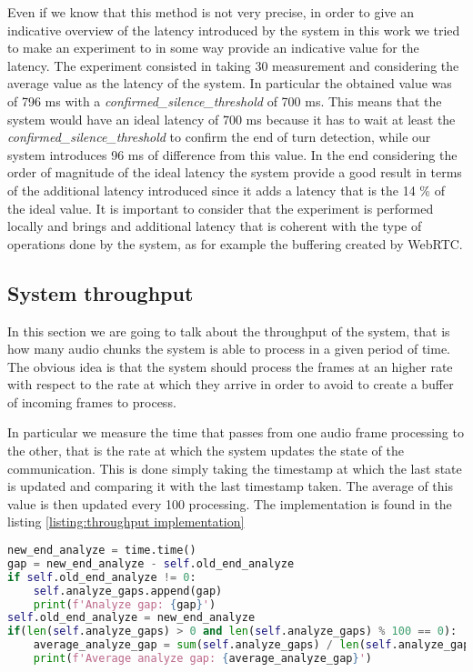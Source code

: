 \documentclass[../main.tex]{subfiles}
\begin{document}
Even if we know that this method is not very precise, in order to give an indicative overview of the latency introduced by the system in this work we tried to make an experiment to in some way provide an indicative value for the latency. The experiment consisted in taking 30 measurement and considering the average value as the latency of the system. In particular the obtained value was of 796 ms with a \textit{confirmed\_silence\_threshold} of 700 ms. This means that the system would have an ideal latency of 700 ms because it has to wait at least the \textit{confirmed\_silence\_threshold} to confirm the end of turn detection, while our system introduces 96 ms of difference from this value. In the end considering the order of magnitude of the ideal latency the system provide a good result in terms of the additional latency introduced since it adds a latency that is the 14 \% of the ideal value. It is important to consider that the experiment is performed locally and brings and additional latency that is coherent with the type of operations done by the system, as for example the buffering created by WebRTC. 

\subsection{System throughput}

In this section we are going to talk about the throughput of the system, that is how many audio chunks the system is able to process in a given period of time. The obvious idea is that the system should process the frames at an higher rate with respect to the rate at which they arrive in order to avoid to create a buffer of incoming frames to process. 

In particular we measure the time that passes from one audio frame processing to the other, that is the rate at which the system updates the state of the communication. This is done simply taking the timestamp at which the last state is updated and comparing it with the last timestamp taken. The average of this value is then updated every 100 processing. The implementation is found in the listing \ref{listing:throughput implementation}

\begin{lstlisting}[language=Python, caption={System throughput analysis implementation}]
new_end_analyze = time.time()
gap = new_end_analyze - self.old_end_analyze
if self.old_end_analyze != 0:
    self.analyze_gaps.append(gap)
    print(f'Analyze gap: {gap}')
self.old_end_analyze = new_end_analyze
if(len(self.analyze_gaps) > 0 and len(self.analyze_gaps) % 100 == 0):
    average_analyze_gap = sum(self.analyze_gaps) / len(self.analyze_gaps)
    print(f'Average analyze gap: {average_analyze_gap}')
\end{lstlisting}
\label{listing:throughput implementation}
\end{document}
